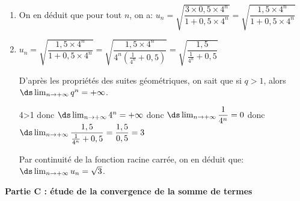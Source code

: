 \begin{enumerate}
\begin{enumerate}
Donc la suite $(v_n)$ est géométrique de premier terme $v_0=0,5$ et de raison $q=4$.

		\item
{}

On en déduit que pour tout $n$, on a:
$u_n=\sqrt{\dfrac{3\times 0,5 \times 4^n}{1+0,5\times 4^n}}
=\sqrt{\dfrac{1,5 \times 4^n}{1+0,5\times 4^n}}$

		\item
$u_n = \sqrt{\dfrac{1,5 \times 4^n}{1+0,5\times 4^n}} = \sqrt{\dfrac{1,5 \times 4^n}{4^n \left ( \frac{1}{4^n}+0,5\right )}} = \sqrt{\dfrac{1,5}{ \frac{1}{4^n}+0,5}}$		

D'après les propriétés des suites géométriques, on sait que si $q>1$, alors $\ds\lim_{n\to +\infty} q^n=+\infty$.

4>1 donc $\ds\lim_{n\to +\infty}4^n=+\infty$ donc
$\ds\lim_{n\to +\infty} \dfrac{1}{4^n} =0$ donc
$\ds\lim_{n\to +\infty} \dfrac{1,5}{\frac{1}{4^n}+0,5}= \dfrac{1,5}{0,5} = 3$

Par continuité de la fonction racine carrée, on en déduit que: $\ds\lim_{n\to +\infty} u_n=\sqrt{3}$.
	\end{enumerate}
\end{enumerate}

\medskip

\textbf{Partie C : étude de la convergence de la somme de termes}

\medskip

